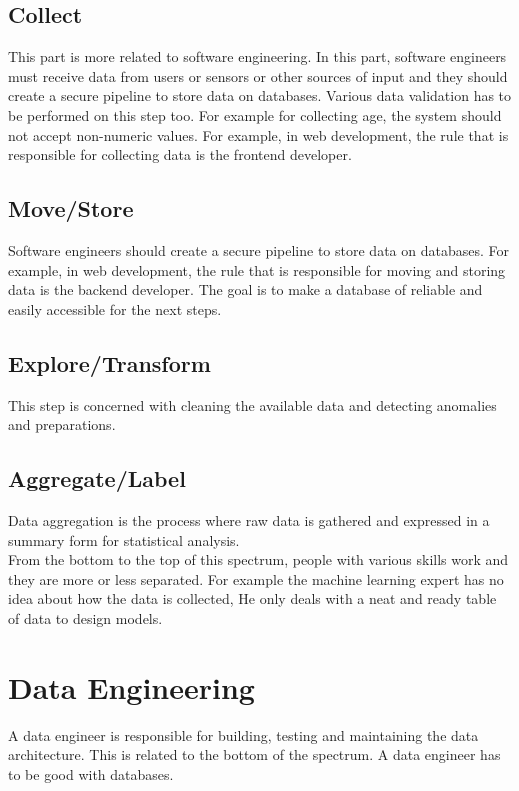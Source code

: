 \documentclass[twocolumn,a4paper, 10pt]{article}
\begin{document}
	\subsection{Collect}
		This part is more related to software engineering. In this part, software engineers must receive data
		from users or sensors or other sources of input and they should create a secure pipeline to store 
		data on databases. Various data validation has to be performed on this step too. For example for collecting age,
		the system should not accept non-numeric values. For example, in web development, the rule that is responsible
		for collecting data is the frontend developer.

	\subsection{Move/Store}
		Software engineers should create a secure pipeline to store 
		data on databases. For example, in web development, the rule that is responsible
		for moving and storing data is the backend developer. The goal is to make a database of reliable and easily 
		accessible for the next steps.

	\subsection{Explore/Transform}
		This step is concerned with cleaning the available data and detecting anomalies and preparations.
	\subsection{Aggregate/Label}
		Data aggregation is the process where raw data is gathered and expressed in a summary form for 
		statistical analysis. \\
		
	From the bottom to the top of this spectrum, people with various skills work and they are more or less
	separated. For example the machine learning expert has no idea about how the data is collected, He only
	deals with a neat and ready table of data to design models.
	
	\section{Data Engineering}
		A data engineer is responsible for building, testing and maintaining the data architecture.
		This is related to the bottom of the spectrum. A data engineer has to be good with databases. 
\end{document}
